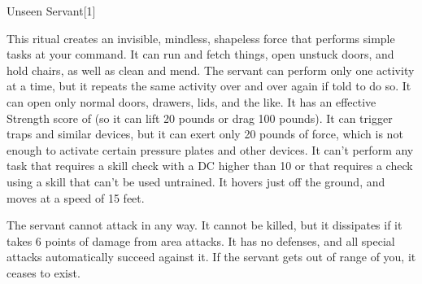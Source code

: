 \begin{spellsection}{Unseen Servant}[1]
    \begin{spellheader}
    \end{spellheader}
    \begin{spellcontent}
        \begin{spelltargetinginfo}
            \spellrng{\rngmed}
        \end{spelltargetinginfo}
        \begin{spelleffects}

            \spelleffect This ritual creates an invisible, mindless, shapeless force that performs simple tasks at your command. It can run and fetch things, open unstuck doors, and hold chairs, as well as clean and mend. The servant can perform only one activity at a time, but it repeats the same activity over and over again if told to do so. It can open only normal doors, drawers, lids, and the like. It has an effective Strength score of  (so it can lift 20 pounds or drag 100 pounds). It can trigger traps and similar devices, but it can exert only 20 pounds of force, which is not enough to activate certain pressure plates and other devices. It can't perform any task that requires a skill check with a DC higher than 10 or that requires a check using a skill that can't be used untrained. It hovers just off the ground, and moves at a speed of 15 feet.
            \par The servant cannot attack in any way. It cannot be killed, but it dissipates if it takes 6 points of damage from area attacks. It has no defenses, and all special attacks automatically succeed against it. If the servant gets out of range of you, it ceases to exist.
            \spelldur \durlong \dismissable
        \end{spelleffects}
    \end{spellcontent}
    \begin{spellfooter}
    \end{spellfooter}
\end{spellsection}

